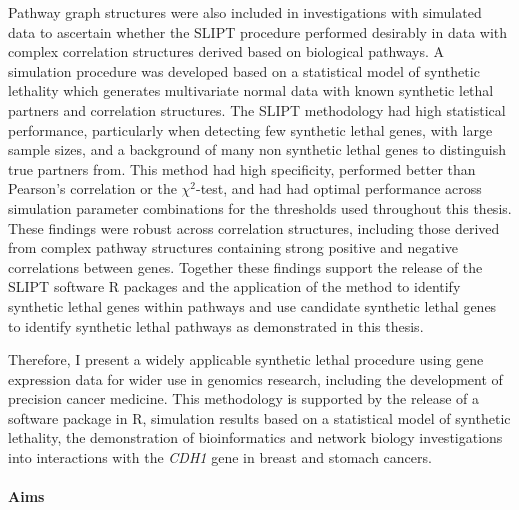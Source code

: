 Pathway graph structures were also included in investigations with simulated data to ascertain whether the \gls{SLIPT} procedure performed desirably in data with complex correlation structures derived based on biological pathways. A simulation procedure was developed based on a statistical model of synthetic lethality which generates multivariate normal data with known synthetic lethal partners and correlation structures. The \gls{SLIPT} methodology had high statistical performance, particularly when detecting few synthetic lethal genes, with large sample sizes, and a background of many non synthetic lethal genes to distinguish true partners from. This method had high specificity, performed better than Pearson's correlation or the $\chi^2$-test, and had had optimal performance across simulation parameter combinations for the thresholds used throughout this thesis. These findings were robust across correlation structures, including those derived from complex pathway structures containing strong positive and negative correlations between genes. 
Together these findings support the release of the \gls{SLIPT} software R packages and the application of the method to identify synthetic lethal genes within pathways and use candidate synthetic lethal genes to identify synthetic lethal pathways as demonstrated in this thesis.

Therefore, I present a widely applicable synthetic lethal procedure using gene expression data for wider use in genomics research, including the development of precision cancer medicine. This methodology is supported by the release of a software package in R, simulation results based on a statistical model of synthetic lethality, the demonstration of bioinformatics and network biology investigations into interactions with the \textit{CDH1} gene in breast and stomach cancers. 


\iffalse
\clearpage
\paragraph{Aims}

